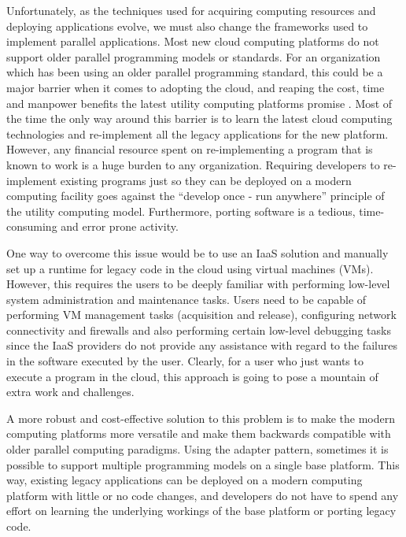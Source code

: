 \documentclass[conference,10pt] {IEEEtran}
\begin{document}
Unfortunately, as the techniques used for acquiring computing resources and deploying applications evolve, we must also change the frameworks used to implement parallel applications. Most new cloud computing platforms do not support older parallel programming models or standards. For an organization which has been using an older parallel programming standard, this could be a major barrier when it comes to adopting the cloud, and reaping the cost, time and manpower benefits the latest utility computing platforms promise \cite{Wilkes:2004:UTI:1133572.1133603}. Most of the time the only way around this barrier is to learn the latest cloud computing technologies and re-implement all the legacy applications for the new platform. However, any financial resource spent on re-implementing a program that is known to work is a huge burden to any organization. Requiring developers to re-implement existing programs just so they can be deployed on a modern computing facility goes against the ``develop once - run anywhere'' principle of the utility computing model. Furthermore, porting software is a tedious, time-consuming and error prone activity.

One way to overcome this issue would be to use an IaaS solution and manually set up a runtime for legacy code in the cloud using virtual machines (VMs). However, this requires the users to be deeply familiar with performing low-level system administration and maintenance tasks. Users need to be capable of performing VM management tasks (acquisition and release), configuring network connectivity and firewalls and also performing certain low-level debugging tasks since the IaaS providers do not provide any assistance with regard to the failures in the software executed by the user. Clearly, for a user who just wants to execute a program in the cloud, this approach is going to pose a mountain of extra work and challenges. 

A more robust and cost-effective solution to this problem is to make the modern computing platforms more versatile and make them backwards compatible with older parallel computing paradigms. Using the adapter pattern, sometimes it is possible to support multiple programming models on a single base platform. This way, existing legacy applications can be deployed on a modern computing platform with little or no code changes, and developers do not have to spend any effort on learning the underlying workings of the base platform or porting legacy code. 
\end{document}
